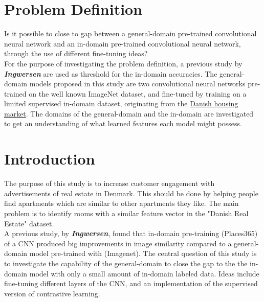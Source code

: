 \section{Problem Definition}\label{sec:Problem Definition}
Is it possible to close to gap between a general-domain pre-trained convolutional neural network and an in-domain pre-trained convolutional neural network, through the use of different fine-tuning ideas?
\vspace{3mm}\\
For the purpose of investigating the problem definition, a previous study by \textbf{\textit{Ingwersen}}\autocite{Ingwersen} are used as threshold for the in-domain accuracies. The general-domain models proposed in this study are two convolutional neural networks pre-trained on the well known ImageNet dataset, and fine-tuned by training on a limited supervised in-domain dataset, originating from the \hyperref[sec:DRE19]{Danish housing market}. The domains of the general-domain and the in-domain are investigated to get an understanding of what learned features each model might possess.
\section{Introduction}\label{sec:Introduction}
The purpose of this study is to increase customer engagement with advertisements of real estate in Denmark. This should be done by helping people find apartments which are similar to other apartments they like. The main problem is to identify rooms with a similar feature vector in the "Danish Real Estate" dataset.
\vspace{3mm}\\
A previous study, by \textbf{\textit{Ingwersen}}\autocite{Ingwersen}, found that in-domain pre-training (Places365) of a CNN produced big improvements in image similarity compared to a general-domain model pre-trained with (Imagenet). The central question of this study is to investigate the capability of the general-domain to close the gap to the the in-domain model with only a small amount of in-domain labeled data. Ideas include fine-tuning different layers of the CNN, and an implementation of the supervised version of contrastive learning.

